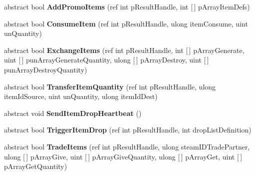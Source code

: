 \begin{DoxyCompactItemize}
\mbox{\label{class_valve_1_1_steamworks_1_1_i_steam_inventory_aea4519b2be2f2cc059dc91be0cf941f1}} 
abstract bool {\bfseries Add\+Promo\+Items} (ref int p\+Result\+Handle, int \mbox{[}$\,$\mbox{]} p\+Array\+Item\+Defs)
\item 
\mbox{\label{class_valve_1_1_steamworks_1_1_i_steam_inventory_aa1bbee3e122211c0fbcc38a670302cfc}} 
abstract bool {\bfseries Consume\+Item} (ref int p\+Result\+Handle, ulong item\+Consume, uint un\+Quantity)
\item 
\mbox{\label{class_valve_1_1_steamworks_1_1_i_steam_inventory_a30f8d46336e626d79051003223a4eae6}} 
abstract bool {\bfseries Exchange\+Items} (ref int p\+Result\+Handle, int \mbox{[}$\,$\mbox{]} p\+Array\+Generate, uint \mbox{[}$\,$\mbox{]} pun\+Array\+Generate\+Quantity, ulong \mbox{[}$\,$\mbox{]} p\+Array\+Destroy, uint \mbox{[}$\,$\mbox{]} pun\+Array\+Destroy\+Quantity)
\item 
\mbox{\label{class_valve_1_1_steamworks_1_1_i_steam_inventory_a6e441bcfc7be7f59d496b8f024257243}} 
abstract bool {\bfseries Transfer\+Item\+Quantity} (ref int p\+Result\+Handle, ulong item\+Id\+Source, uint un\+Quantity, ulong item\+Id\+Dest)
\item 
\mbox{\label{class_valve_1_1_steamworks_1_1_i_steam_inventory_af631ad216b43fc6da71113939e2e0fb6}} 
abstract void {\bfseries Send\+Item\+Drop\+Heartbeat} ()
\item 
\mbox{\label{class_valve_1_1_steamworks_1_1_i_steam_inventory_ad464aae9677e1161f9d97e1321c34cf4}} 
abstract bool {\bfseries Trigger\+Item\+Drop} (ref int p\+Result\+Handle, int drop\+List\+Definition)
\item 
\mbox{\label{class_valve_1_1_steamworks_1_1_i_steam_inventory_a6f986fe9cba06d6d2938fd24b6bbc3a6}} 
abstract bool {\bfseries Trade\+Items} (ref int p\+Result\+Handle, ulong steam\+I\+D\+Trade\+Partner, ulong \mbox{[}$\,$\mbox{]} p\+Array\+Give, uint \mbox{[}$\,$\mbox{]} p\+Array\+Give\+Quantity, ulong \mbox{[}$\,$\mbox{]} p\+Array\+Get, uint \mbox{[}$\,$\mbox{]} p\+Array\+Get\+Quantity)

\end{DoxyCompactItemize}
